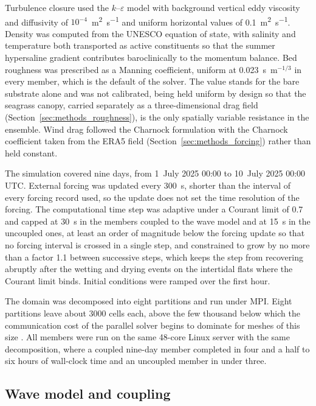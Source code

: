 Turbulence closure used the $k$--$\varepsilon$ model with background vertical
eddy viscosity and diffusivity of $10^{-4}$~\si{\metre\squared\per\second} and
uniform horizontal values of 0.1~\si{\metre\squared\per\second}. Density was
computed from the UNESCO equation of state, with salinity and temperature both
transported as active constituents so that the summer hypersaline gradient
contributes baroclinically to the momentum balance. Bed roughness was
prescribed as a Manning coefficient, uniform at 0.023~s~m$^{-1/3}$ in every
member, which is the default of the solver. The value stands for the bare
substrate alone and was not calibrated, being held uniform by design so that the seagrass canopy, carried separately as a
three-dimensional drag field (Section~\ref{sec:methods_roughness}), is the only
spatially variable resistance in the ensemble. Wind drag followed the Charnock
formulation with the Charnock coefficient taken from the ERA5 field
(Section~\ref{sec:methods_forcing}) rather than held constant.

The simulation covered nine days, from 1~July 2025 00:00 to 10~July 2025 00:00
UTC. External forcing was updated every 300~s, shorter than the interval of
every forcing record used, so the update does not set the time resolution of
the forcing. The computational time step was adaptive under a Courant limit of
0.7 and capped at 30~s in the members coupled to the wave model and at 15~s in
the uncoupled ones, at least an order of magnitude below the forcing update so
that no forcing interval is crossed in a single step, and constrained to grow by no
more than a factor 1.1 between successive steps, which keeps the step from
recovering abruptly after the wetting and drying events on the intertidal flats
where the Courant limit binds. Initial conditions were ramped over the first
hour.

The domain was decomposed into eight partitions and run under MPI. Eight
partitions leave about 3000 cells each, above the few thousand below which the
communication cost of the parallel solver begins to dominate for meshes of this
size \citep{Moge2019}. All members were run on the same 48-core Linux server
with the same decomposition, where a coupled nine-day member completed in four
and a half to six hours of wall-clock time and an uncoupled member in under
three.

\subsection{Wave model and coupling}
\label{sec:methods_waves}

